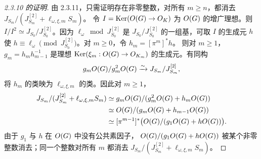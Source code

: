 \begin{proof}[2.3.10 的证明]
由 2.3.11，只需证明存在非零整数，对所有 $m\geq n$，都消去
$J_{S_m}/(J_{S_m}^{[2]}+\ell_{\omega,\xi,m}S_m)$。
令 $I=\operatorname{Ker}(O(G)\to O_K)$ 为 $O(G)$ 的增广理想。则
$I/I^2\simeq J_{S_0}/J_{S_0}^{[2]}$。因为 $\ell_\omega\bmod J_{S_0}^{[2]}$
是 $J_{S_0}/J_{S_0}^{[2]}$ 的一组基，可取 $I$ 的生成元 $h$ 使
$h\equiv\ell_\omega\pmod{J_{S_0}^{[2]}}$。对 $m\geq0$，令 $h_m=[\pi^m]^*h$。
则对 $m\geq1$，$g_m=h_mh_{m-1}^{-1}$ 是理想
$\operatorname{Ker}(\xi_m:O(G)\to O_{K_m})$ 的生成元。有同构
\[
g_mO(G)/g_m^2O(G)\xrightarrow{\sim}J_{S_m}/J_{S_m}^{[2]},
\]
将 $h_m$ 的类映为 $\ell_{\omega,\xi,m}$ 的类。因此对 $m\geq1$，
\begin{align*}
J_{S_m}/(J_{S_m}^{[2]}+\ell_{\omega,\xi,m}S_m)
&\simeq g_mO(G)/(g_m^2O(G)+h_mO(G))\\
&\simeq O(G)/(g_mO(G)+h_{m-1}O(G))\\
&\simeq[\pi^{m-1}]^*\bigl(O(G)/(g_1O(G)+hO(G))\bigr).
\end{align*}
由于 $g_1$ 与 $h$ 在 $O(G)$ 中没有公共素因子，
$O(G)/(g_1O(G)+hO(G))$ 被某个非零整数消去；同一个整数对所有 $m$
都消去 $J_{S_m}/(J_{S_m}^{[2]}+\ell_{\omega,\xi,m}S_m)$。
\end{proof}

